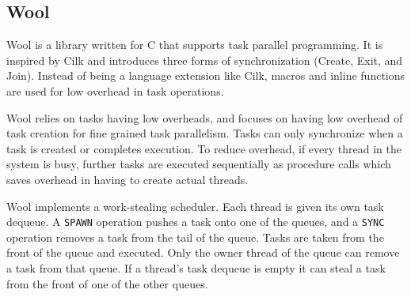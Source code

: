 \subsection{Wool}
Wool\cite{wool} is a library written for C that supports task parallel programming. It is inspired by Cilk and introduces
three forms of synchronization (Create, Exit, and Join). Instead of being a language extension like Cilk, macros and
inline functions are used for low overhead in task operations. 

Wool relies on tasks having low overheads, and focuses on having low overhead of task creation for fine grained task parallelism. 
Tasks can only synchronize when a task is created or completes execution. To reduce overhead, if every thread
in the system is busy, further tasks are executed sequentially as procedure calls which saves overhead in having
to create actual threads.

Wool implements a work-stealing scheduler.
Each thread is given its own task dequeue. A \texttt{SPAWN} operation pushes a task onto 
one of the queues, and a \texttt{SYNC} operation removes a task from the tail of the queue.
Tasks are taken from the front of the queue and executed. Only the owner thread of the queue can remove a task from that queue. 
If a thread's task dequeue is empty it can steal a task from the front of one of the other queues.

